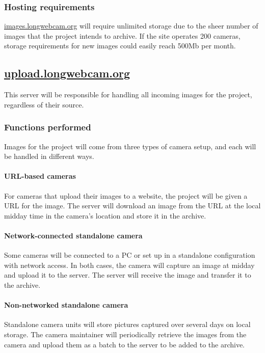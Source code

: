 \documentclass[11pt]{article}
\begin{document}
\subsubsection{Hosting requirements}
\label{sec:images_hosting}
\url{images.longwebcam.org} will require unlimited storage due to the sheer number of images that the project intends to archive. If the site operates 200 cameras, storage requirements for new images could easily reach 500Mb per month.



\subsection{\protect\url{upload.longwebcam.org}}

This server will be responsible for handling all incoming images for the project, regardless of their source.

\subsubsection{Functions performed}

Images for the project will come from three types of camera setup, and each will be handled in different ways.

\paragraph{URL-based cameras} For cameras that upload their images to a website, the project will be given a URL for the image. The server will download an image from the URL at the local midday time in the camera's location and store it in the archive.

\paragraph{Network-connected standalone camera} Some cameras will be connected to a PC or set up in a standalone configuration with network access. In both cases, the camera will capture an image at midday and upload it to the server. The server will receive the image and transfer it to the archive.

\paragraph{Non-networked standalone camera} Standalone camera units will store pictures captured over several days on local storage. The camera maintainer will periodically retrieve the images from the camera and upload them as a batch to the server to be added to the archive.
\end{document}
